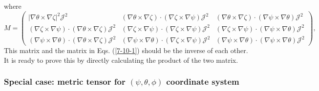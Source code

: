 \documentclass{llncs}
\begin{document}
where
\[ M = \left(\begin{array}{ccc}
     | \nabla \theta \times \nabla \zeta |^2 \mathcal{J}^2 & (\nabla \theta
     \times \nabla \zeta) \cdot (\nabla \zeta \times \nabla \psi)
     \mathcal{J}^2 & (\nabla \theta \times \nabla \zeta) \cdot (\nabla \psi
     \times \nabla \theta) \mathcal{J}^2\\
     (\nabla \zeta \times \nabla \psi) \cdot (\nabla \theta \times \nabla
     \zeta) \mathcal{J}^2 & (\nabla \zeta \times \nabla \psi) \cdot (\nabla
     \zeta \times \nabla \psi) \mathcal{J}^2 & (\nabla \zeta \times \nabla
     \psi) \cdot (\nabla \psi \times \nabla \theta) \mathcal{J}^2\\
     (\nabla \psi \times \nabla \theta) \cdot (\nabla \theta \times \nabla
     \zeta) \mathcal{J}^2 & (\nabla \psi \times \nabla \theta) \cdot (\nabla
     \zeta \times \nabla \psi) \mathcal{J}^2 & (\nabla \psi \times \nabla
     \theta) \cdot (\nabla \psi \times \nabla \theta) \mathcal{J}^2
   \end{array}\right), \]
This matrix and the matrix in Eqs. (\ref{7-10-1}) should be the inverse of
each other. It is ready to prove this by directly calculating the product of
the two matrix.

\subsubsection{Special case: metric tensor for $(\psi, \theta, \phi)$
coordinate system}
\end{document}

